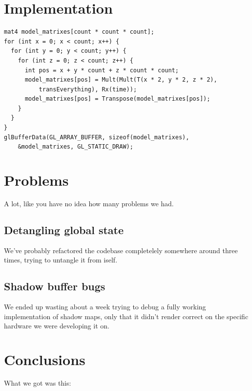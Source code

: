 \documentclass[a4paper,12pt]{article}
\begin{document}
\section{Implementation}

\begin{lstlisting}
mat4 model_matrixes[count * count * count];
for (int x = 0; x < count; x++) {
  for (int y = 0; y < count; y++) {
    for (int z = 0; z < count; z++) {
      int pos = x + y * count + z * count * count;
      model_matrixes[pos] = Mult(Mult(T(x * 2, y * 2, z * 2),
          transEverything), Rx(time));
      model_matrixes[pos] = Transpose(model_matrixes[pos]);
    }
  }
}
glBufferData(GL_ARRAY_BUFFER, sizeof(model_matrixes),
    &model_matrixes, GL_STATIC_DRAW);
\end{lstlisting}


\section{Problems}

A lot, like you have no idea how many problems we had.

\subsection{Detangling global state}

We've probably refactored the codebase completelely somewhere around three times, trying to untangle it from iself.

\subsection{Shadow buffer bugs}

We ended up wasting about a week trying to debug a fully working implementation of shadow maps, only that it didn't render correct on the specific hardware we were developing it on.

\section{Conclusions}

What we got was this:
\end{document}
